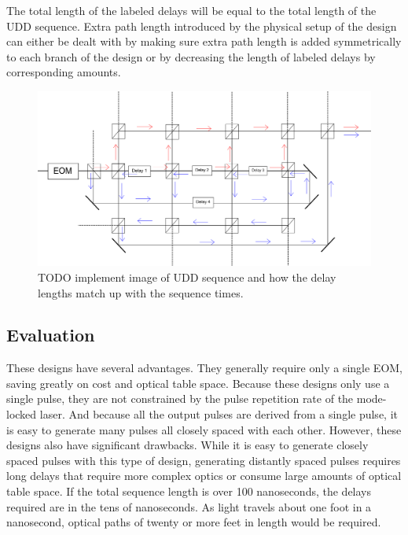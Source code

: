 \documentclass[pdftex,12pt,a4paper]{article}
\begin{document}
The total length of the labeled delays will be equal to the total length of the UDD sequence. Extra path length introduced by the physical setup of the design can either be dealt with by making sure extra path length is added symmetrically to each branch of the design or by decreasing the length of labeled delays by corresponding amounts.



\begin{figure}[H]
\centering
\includegraphics[width=\textwidth]{singlepulse.png}
\caption{TODO implement image of UDD sequence and how the delay lengths match up with the sequence times.}
\label{fig:UDDseqdelays}
\end{figure}

\subsection{Evaluation}

These designs have several advantages. They generally require only a single EOM, saving greatly on cost and optical table space. Because these designs only use a single pulse, they are not constrained by the pulse repetition rate of the mode-locked laser. And because all the output pulses are derived from a single pulse, it is easy to generate many pulses all closely spaced with each other. However, these designs also have significant drawbacks. While it is easy to generate closely spaced pulses with this type of design, generating distantly spaced pulses requires long delays that require more complex optics or consume large amounts of optical table space. If the total sequence length is over 100 nanoseconds, the delays required are in the tens of nanoseconds. As light travels about one foot in a nanosecond, optical paths of twenty or more feet in length would be required. 
\end{document}
